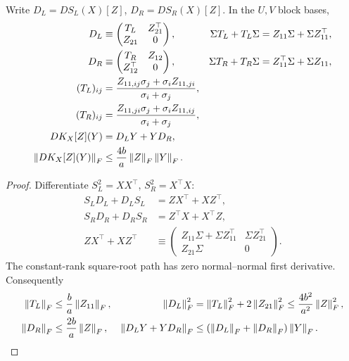 \begin{theorem}
\label{thm:metric-derivative}
Write $D_L=DS_L(X)[Z]$, $D_R=DS_R(X)[Z]$. In the $U,V$ block bases,
\begin{align}
D_L&\equiv\begin{pmatrix}T_L&Z_{21}^\top\\Z_{21}&0\end{pmatrix},&
\Sigma T_L+T_L\Sigma&=Z_{11}\Sigma+\Sigma Z_{11}^\top,\\
D_R&\equiv\begin{pmatrix}T_R&Z_{12}\\Z_{12}^\top&0\end{pmatrix},&
\Sigma T_R+T_R\Sigma&=Z_{11}^\top\Sigma+\Sigma Z_{11},\\
(T_L)_{ij}
&=\frac{Z_{11,ij}\sigma_j+\sigma_i Z_{11,ji}}{\sigma_i+\sigma_j},\\
(T_R)_{ij}
&=\frac{Z_{11,ji}\sigma_j+\sigma_i Z_{11,ij}}{\sigma_i+\sigma_j},\\
DK_X[Z](Y)&=D_LY+YD_R,\\
\left\lVert DK_X[Z](Y)\right\rVert_F&\leq \frac{4b}{a}\left\lVert Z\right\rVert_F\left\lVert Y\right\rVert_F .
\label{eq:rigid-DK}
\end{align}
\end{theorem}
\begin{proof}
Differentiate $S_L^2=XX^\top$, $S_R^2=X^\top X$:
\begin{align}
S_LD_L+D_LS_L&=ZX^\top+XZ^\top,\\
S_RD_R+D_RS_R&=Z^\top X+X^\top Z,\\
ZX^\top+XZ^\top
&\equiv\begin{pmatrix}
Z_{11}\Sigma+\Sigma Z_{11}^\top&\Sigma Z_{21}^\top\\
Z_{21}\Sigma&0
\end{pmatrix}.
\end{align}
The constant-rank square-root path has zero normal--normal first derivative.
Consequently
\begin{align}
\left\lVert T_L\right\rVert_F&\leq\frac ba\left\lVert Z_{11}\right\rVert_F,&
\left\lVert D_L\right\rVert_F^2&=\left\lVert T_L\right\rVert_F^2+2\left\lVert Z_{21}\right\rVert_F^2
\leq\frac{4b^2}{a^2}\left\lVert Z\right\rVert_F^2,\\
\left\lVert D_R\right\rVert_F&\leq\frac{2b}{a}\left\lVert Z\right\rVert_F,&
\left\lVert D_LY+YD_R\right\rVert_F&\leq(\left\lVert D_L\right\rVert_F+\left\lVert D_R\right\rVert_F)\left\lVert Y\right\rVert_F .
\end{align}
\end{proof}

